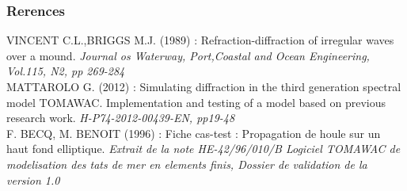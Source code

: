 \subsubsection*{Rerences}

 VINCENT C.L.,BRIGGS M.J. (1989) : Refraction-diffraction of irregular waves over a mound. \textit{Journal os Waterway, Port,Coastal and Ocean Engineering, Vol.115, N2, pp 269-284}\\
 MATTAROLO G. (2012) : Simulating diffraction in the third generation spectral model TOMAWAC. Implementation and testing of a model based on previous research work. \textit{H-P74-2012-00439-EN, pp19-48}\\
 F. BECQ, M. BENOIT (1996) : Fiche cas-test : Propagation de houle sur un haut fond elliptique. \textit{Extrait de la note HE-42/96/010/B Logiciel TOMAWAC de modelisation des tats de mer en elements finis, Dossier de validation de la version 1.0} 